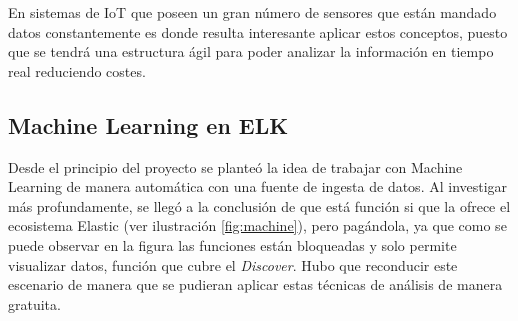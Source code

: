 En sistemas de IoT que poseen un gran número de sensores que están mandado datos constantemente es donde resulta interesante aplicar estos conceptos, puesto que se tendrá una estructura ágil para poder analizar la información en tiempo real reduciendo costes.

\paragraph{}
\paragraph{}
\paragraph{}
\paragraph{}
\paragraph{}
\paragraph{}
\paragraph{  }
\paragraph{  }


\subsection{Machine Learning en ELK}

Desde el principio del proyecto se planteó la idea de trabajar con Machine Learning de manera automática con una fuente de ingesta de datos. Al investigar más profundamente, se llegó a la conclusión de que está función si que la ofrece el ecosistema Elastic  (ver ilustración  \ref{fig:machine}), pero pagándola, ya que como se puede observar en la figura las funciones están bloqueadas y solo permite visualizar datos, función que cubre el \textit{Discover}. Hubo que reconducir este escenario de manera que se pudieran aplicar estas técnicas de análisis de manera gratuita.

